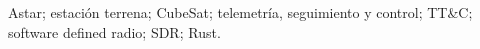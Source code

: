 
Astar; estación terrena; CubeSat; telemetría, seguimiento y control; TT\&C; software defined radio; SDR; Rust.